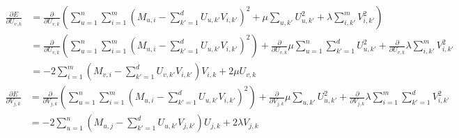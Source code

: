 \documentclass{article}
\begin{document}
\begin{align*}
    \frac{\partial E}{\partial U_{v,k}} &= \frac{\partial}{\partial U_{v,k}}\left(\sum_{u=1}^n\sum_{i=1}^m{(M_{u,i} - \sum_{k'=1}^d{U_{u,k'}V_{i,k'}})^2} + \mu\sum_{u, k'}{U_{u,k'}^2} + \lambda\sum_{i,k'}^m{V_{i,k'}^2}\right)\\
    &= \frac{\partial}{\partial U_{v,k}}\left(\sum_{u=1}^n\sum_{i=1}^m{(M_{u,i} - \sum_{k'=1}^d{U_{u,k'}V_{i,k'}})^2}\right) + \frac{\partial}{\partial U_{v,k}}\mu\sum_{u=1}^n\sum_{k'=1}^d{U_{u,k'}^2} + \frac{\partial}{\partial U_{v,k}}\lambda\sum_{i,k'}^m{V_{i,k'}^2}\\
    &= -2\sum_{i=1}^m{(M_{v,i} - \sum_{k'=1}^d{U_{v,k'}V_{i,k'}})V_{i,k}} + 2\mu U_{v,k}
\end{align*}
\begin{align*}
    \frac{\partial E}{\partial V_{j,k}} &= \frac{\partial}{\partial V_{j,k}}\left(\sum_{u=1}^n\sum_{i=1}^m{(M_{u,i} - \sum_{k'=1}^d{U_{u,k'}V_{i,k'}})^2}\right) + \frac{\partial}{\partial V_{j,k}}\mu\sum_{u, k'}{U_{u,k'}^2} + \frac{\partial}{\partial V_{j,k}}\lambda\sum_{i=1}^m\sum_{k'=1}^d{V_{i,k'}^2}\\
    &= -2\sum_{u=1}^n{(M_{u,j} - \sum_{k'=1}^d{U_{u,k'}V_{j,k'}})U_{j,k}} + 2\lambda V_{j,k}
\end{align*}
\end{document}
